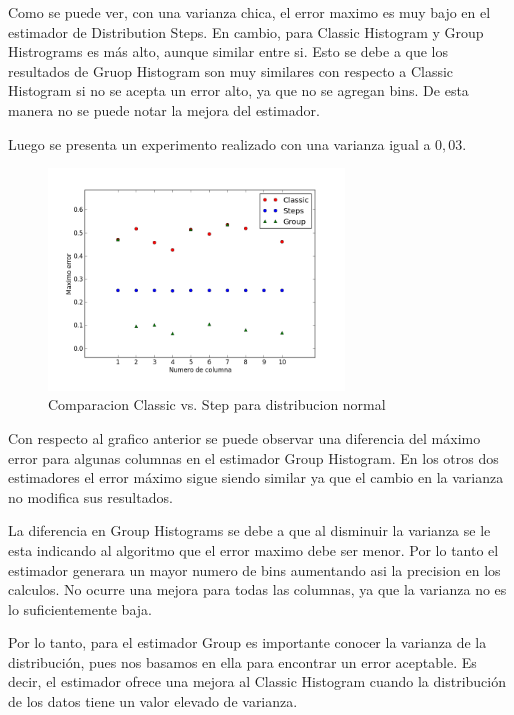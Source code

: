 \documentclass[10pt, a4paper,english,spanish,hidelinks]{article}
\begin{document}
Como se puede ver, con una varianza chica, el error maximo es muy bajo en el estimador de Distribution Steps. En cambio, para Classic Histogram y Group Histrograms es más alto, aunque similar entre si. Esto se debe a que los resultados de Gruop Histogram son muy similares con respecto a Classic Histogram si no se acepta un error alto, ya que no se agregan bins. De esta manera no se puede notar la mejora del estimador.


Luego se presenta un experimento realizado con una varianza igual a $0,03$. 
\newpage
\begin{figure}
  \centering
  \includegraphics[width=0.7\textwidth]{./imagenes/ejb2_normal_t_003.png}
  \caption{Comparacion Classic vs. Step para distribucion normal}
\end{figure}

Con respecto al grafico anterior se puede observar una diferencia del máximo error para algunas columnas en el estimador Group Histogram. En los otros dos estimadores el error máximo sigue siendo similar ya que el cambio en la varianza no modifica sus resultados. 

La diferencia en Group Histograms se debe a que al disminuir la varianza se le esta indicando al algoritmo que el error maximo debe ser menor. Por lo tanto el estimador generara un mayor numero de bins aumentando asi la precision en los calculos. No ocurre una mejora para todas las columnas, ya que la varianza no es lo suficientemente baja. 

Por lo tanto, para el estimador Group es importante conocer la varianza de la distribución, pues nos
basamos en ella para encontrar un error aceptable. Es decir, el estimador ofrece una mejora al Classic Histogram cuando la distribución de los datos tiene un valor elevado de varianza.
\end{document}
